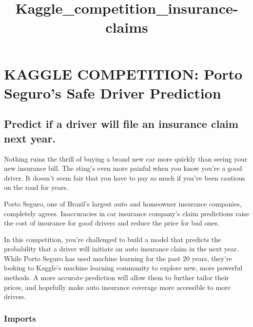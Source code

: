 \documentclass[11pt]{article}
\title{Kaggle\_competition\_insurance-claims}
\begin{document}
    
    
    \maketitle
    
    

    
    \section{KAGGLE COMPETITION: Porto Seguro's Safe Driver
Prediction}\label{kaggle-competition-porto-seguros-safe-driver-prediction}

    \subsection{Predict if a driver will file an insurance claim next
year.}\label{predict-if-a-driver-will-file-an-insurance-claim-next-year.}

    Nothing ruins the thrill of buying a brand new car more quickly than
seeing your new insurance bill. The sting's even more painful when you
know you're a good driver. It doesn't seem fair that you have to pay so
much if you've been cautious on the road for years.

Porto Seguro, one of Brazil's largest auto and homeowner insurance
companies, completely agrees. Inaccuracies in car insurance company's
claim predictions raise the cost of insurance for good drivers and
reduce the price for bad ones.

In this competition, you're challenged to build a model that predicts
the probability that a driver will initiate an auto insurance claim in
the next year. While Porto Seguro has used machine learning for the past
20 years, they're looking to Kaggle's machine learning community to
explore new, more powerful methods. A more accurate prediction will
allow them to further tailor their prices, and hopefully make auto
insurance coverage more accessible to more drivers.

    \subsubsection{Imports}\label{imports}
\end{document}
